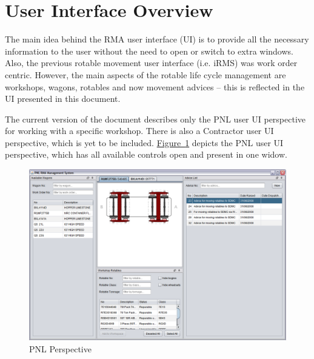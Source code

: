 \section{User Interface Overview}
The main idea behind the RMA user interface (UI) is to provide all the necessary information to the user without the need to open or switch to extra windows. Also, the previous rotable movement user interface (i.e. iRMS) was work order centric. However, the main aspects of the rotable life cycle management are workshops, wagons, rotables and now movement advices -- this is reflected in the UI presented in this document.

The current version of the document describes only the PNL user UI perspective for working with a specific workshop. There is also a Contractor user UI perspective, which is yet to be included. \hyperref[fig:01-complete-ui]{Figure~\ref*{fig:01-complete-ui}} depicts the PNL user UI perspective, which has all available controls open and present in one widow.

\begin{figure}[!h]
\centering
\includegraphics[scale=0.37]{chapters/01-user-interface/images/01-complete-ui.png}
\caption{PNL Perspective}\label{fig:01-complete-ui}
\end{figure}

